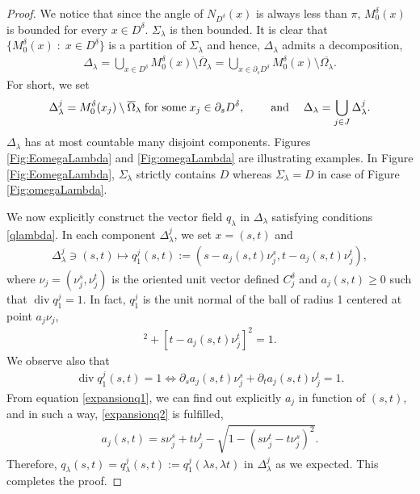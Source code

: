 \documentclass[reqno,11pt]{amsart}
\theoremstyle{definition}
\numberwithin{equation}{section}
\def\ov{\overline}
\DeclareMathOperator{\Div}{div}
\newcommand{\tinm}[1]{\text{\;#1\;}}
\newcommand{\1}{{{\bf 1}\kern-0,28em\rm l}}
\def\sepa{\; : \;}
\begin{document}
\begin{proof}
 We notice that since the angle of $N_{D^\delta}(x)$ is always less than $\pi$, $M^\delta_0(x)$ is bounded for every $x\in D^\delta$. $\Sigma_\lambda$ is then bounded. It is clear that $\{M^\delta_0(x) \sepa x\in D^\delta\}$ is a partition of $\Sigma_\lambda$ and hence, $\Delta_\lambda$ admits a decomposition,
\begin{align}
\Delta_\lambda = \bigcup_{x\in D^\delta} M^\delta_0(x) \setminus\ov \Omega_\lambda = \bigcup_{x\in \partial_s  D^\delta} M^\delta_0(x) \setminus \ov{\Omega_\lambda}.
\end{align}
For short, we set
\begin{align}
\Delta_\lambda ^j=  M^\delta_0(x_j) \setminus\ov \Omega_\lambda \tinm{for some} x_j\in\partial_s D^\delta, \qquad \tinm{and}\quad \Delta_\lambda = \bigcup_{j\in J} \Delta_\lambda ^j.
\end{align}
$ \Delta_\lambda$ has  at most countable many disjoint components. Figures \ref{Fig:EomegaLambda} and \ref{Fig:omegaLambda} are illustrating examples. In Figure \ref{Fig:EomegaLambda}, $\Sigma_\lambda$ strictly contains $D$ whereas $\Sigma_\lambda=D$  in case of Figure \ref{Fig:omegaLambda}.


We now explicitly construct the vector field $q_\lambda$  in $\Delta_\lambda$ satisfying conditions \eqref{qlambda}. In each component $\Delta^j_\lambda$, we set $x=(s,t)$ and
\begin{align}
\Delta^j_\lambda \ni (s,t)\mapsto q_1^j(s,t):= (s - a_j(s,t)\nu_j^s, t - a_j(s,t)\nu_j^t),\label{def:q1ext}
\end{align}
where $\nu_j=(\nu_j^s,\nu_j^t)$ is the oriented unit vector defined $C^\delta_j$ and $a_j(s,t)\ge 0$ such that $\Div q_1^j = 1$. In fact, $q_1^j$ is the unit normal of the ball of radius 1 centered at point $a_j\nu_j$,
\begin{align}
[s - a_j(s,t)\nu_j^s]^2 + [t - a_j(s,t)\nu_j^t]^2 = 1. \label{expansionq1}
\end{align}
We observe also that 
\begin{align}
\Div q_1^j(s,t) = 1 \Longleftrightarrow \partial_s a_j(s,t) \nu_j^s + \partial_t a_j(s,t)\nu_j^t = 1. \label{expansionq2}
\end{align}
From equation \eqref{expansionq1}, we can find out explicitly $a_j$ in function of $(s,t)$, and in such a way, \eqref{expansionq2} is fulfilled,
\begin{align}
a_j(s,t)= s\nu_j^s + t\nu_j^t - \sqrt{1 - (s\nu_j^t - t\nu_j^s)^2}.\label{def:q1trans}
\end{align}
Therefore, $q_\lambda(s,t)=q_\lambda^j(s,t):= q_1^j(\lambda s,\lambda t)$ in $\Delta^j_\lambda$ as we expected. This completes the proof.
\end{proof}
\end{document}
